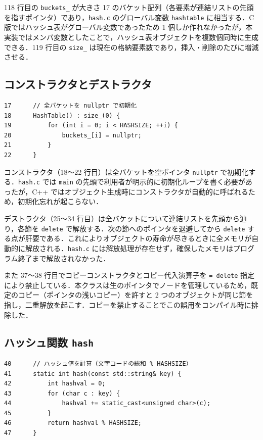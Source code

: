 118 行目の {\tt buckets\_} が大きさ 17 のバケット配列（各要素が連結リストの先頭を指すポインタ）であり，{\tt hash.c} のグローバル変数 {\tt hashtable} に相当する．C 版ではハッシュ表がグローバル変数であったため 1 個しか作れなかったが，本実装ではメンバ変数としたことで，ハッシュ表オブジェクトを複数個同時に生成できる．119 行目の {\tt size\_} は現在の格納要素数であり，挿入・削除のたびに増減させる．

\subsection{コンストラクタとデストラクタ}

\begin{verbatim}
17      // 全バケットを nullptr で初期化
18      HashTable() : size_(0) {
19          for (int i = 0; i < HASHSIZE; ++i) {
20              buckets_[i] = nullptr;
21          }
22      }
\end{verbatim}

コンストラクタ（18〜22 行目）は全バケットを空ポインタ {\tt nullptr} で初期化する．{\tt hash.c} では {\tt main} の先頭で利用者が明示的に初期化ループを書く必要があったが，C++ ではオブジェクト生成時にコンストラクタが自動的に呼ばれるため，初期化忘れが起こらない．

デストラクタ（25〜34 行目）は全バケットについて連結リストを先頭から辿り，各節を {\tt delete} で解放する．次の節へのポインタを退避してから {\tt delete} する点が肝要である．これによりオブジェクトの寿命が尽きるときに全メモリが自動的に解放される．{\tt hash.c} には解放処理が存在せず，確保したメモリはプログラム終了まで解放されなかった．

また 37〜38 行目でコピーコンストラクタとコピー代入演算子を {\tt = delete} 指定により禁止している．本クラスは生のポインタでノードを管理しているため，既定のコピー（ポインタの浅いコピー）を許すと 2 つのオブジェクトが同じ節を指し，二重解放を起こす．コピーを禁止することでこの誤用をコンパイル時に排除した．

\subsection{ハッシュ関数 {\tt hash}}

\begin{verbatim}
40      // ハッシュ値を計算（文字コードの総和 % HASHSIZE）
41      static int hash(const std::string& key) {
42          int hashval = 0;
43          for (char c : key) {
44              hashval += static_cast<unsigned char>(c);
45          }
46          return hashval % HASHSIZE;
47      }
\end{verbatim}


